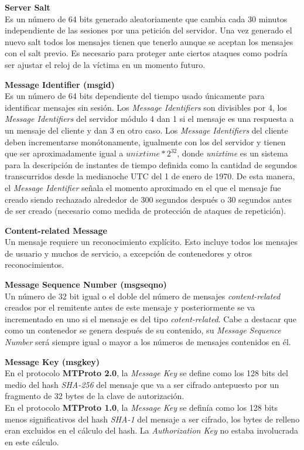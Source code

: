 \begin{description}
	\item  \textbf{Server Salt}\\
	Es un número de 64 bits generado aleatoriamente que cambia cada 30 minutos independiente de las sesiones por una petición del servidor. Una vez generado el nuevo salt todos los mensajes tienen que tenerlo aunque se aceptan los mensajes con el salt previo. Es necesario para proteger ante ciertos ataques como podría ser ajustar el reloj de la víctima en un momento futuro.

	\item \textbf{Message Identifier (msg\textunderscore id)}\\
	Es un número de 64 bits dependiente del tiempo usado únicamente para identificar mensajes sin sesión. Los \emph{Message Identifiers} son divisibles por 4, los \emph{Message Identifiers} del servidor módulo 4 dan 1 si el mensaje es una respuesta a un mensaje del cliente y dan 3 en otro caso. 
	Los \emph{Message Identifiers} del cliente deben incrementarse monótonamente, igualmente con los del servidor y tienen que ser aproximadamente igual a $unixtime*2^{32}$, donde \emph{unixtime} es un sistema para la descripción de instantes de tiempo definida como la cantidad de segundos transcurridos desde la medianoche UTC del 1 de enero de 1970. 
	De esta manera, el \emph{Message Identifier} señala el momento aproximado en el que el mensaje fue creado siendo rechazado alrededor de 300 segundos después o 30 segundos antes de ser creado (necesario como medida de protección de ataques de repetición).  

	\item \textbf{Content-related Message}\\
	Un mensaje requiere un reconocimiento explícito. Esto incluye todos los mensajes de usuario y muchos de servicio, a excepción de contenedores y otros reconocimientos.

	\item \textbf{Message Sequence Number (msg\textunderscore seqno)}\\
	Un número de 32 bit igual o el doble del número de mensajes \emph{content-related} creados por el remitente antes de este mensaje y posteriormente se va incrementado en uno si el mensaje es del tipo \emph{cotent-related}. Cabe a destacar que como un contenedor se genera después de su contenido, su \emph{Message Sequence Number} será siempre igual o mayor a los números de mensajes contenidos en él.

	\item \textbf{Message Key (msg\textunderscore key)}\\
	En el protocolo \textbf{MTProto 2.0}, la \emph{Message Key} se define como los 128 bits del medio del hash \emph{SHA-256} del mensaje que va a ser cifrado antepuesto por un fragmento de 32 bytes de la clave de autorización.\\
	En el protocolo \textbf{MTProto 1.0}, la \emph{Message Key} se definía como los 128 bits menos significativos del hash \emph{SHA-1} del mensaje a ser cifrado, los bytes de relleno eran excluidos en el cálculo del hash. La \emph{Authorization Key} no estaba involucrada en este cálculo.


\end{description}
